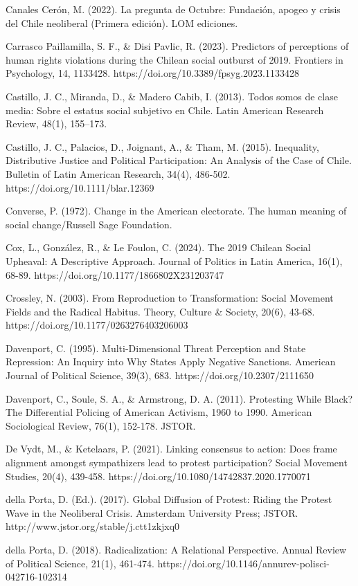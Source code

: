 \documentclass[
  13pt,
]{article}
\begin{document}
Canales Cerón, M. (2022). La pregunta de Octubre: Fundación, apogeo y
crisis del Chile neoliberal (Primera edición). LOM ediciones.

Carrasco Paillamilla, S. F., \& Disi Pavlic, R. (2023). Predictors of
perceptions of human rights violations during the Chilean social
outburst of 2019. Frontiers in Psychology, 14, 1133428.
https://doi.org/10.3389/fpsyg.2023.1133428

Castillo, J. C., Miranda, D., \& Madero Cabib, I. (2013). Todos somos de
clase media: Sobre el estatus social subjetivo en Chile. Latin American
Research Review, 48(1), 155--173.

Castillo, J. C., Palacios, D., Joignant, A., \& Tham, M. (2015).
Inequality, Distributive Justice and Political Participation: An
Analysis of the Case of Chile. Bulletin of Latin American Research,
34(4), 486-502. https://doi.org/10.1111/blar.12369

Converse, P. (1972). Change in the American electorate. The human
meaning of social change/Russell Sage Foundation.

Cox, L., González, R., \& Le Foulon, C. (2024). The 2019 Chilean Social
Upheaval: A Descriptive Approach. Journal of Politics in Latin America,
16(1), 68-89. https://doi.org/10.1177/1866802X231203747

Crossley, N. (2003). From Reproduction to Transformation: Social
Movement Fields and the Radical Habitus. Theory, Culture \& Society,
20(6), 43-68. https://doi.org/10.1177/0263276403206003

Davenport, C. (1995). Multi-Dimensional Threat Perception and State
Repression: An Inquiry into Why States Apply Negative Sanctions.
American Journal of Political Science, 39(3), 683.
https://doi.org/10.2307/2111650

Davenport, C., Soule, S. A., \& Armstrong, D. A. (2011). Protesting
While Black? The Differential Policing of American Activism, 1960 to
1990. American Sociological Review, 76(1), 152-178. JSTOR.

De Vydt, M., \& Ketelaars, P. (2021). Linking consensus to action: Does
frame alignment amongst sympathizers lead to protest participation?
Social Movement Studies, 20(4), 439-458.
https://doi.org/10.1080/14742837.2020.1770071

della Porta, D. (Ed.). (2017). Global Diffusion of Protest: Riding the
Protest Wave in the Neoliberal Crisis. Amsterdam University Press;
JSTOR. http://www.jstor.org/stable/j.ctt1zkjxq0

della Porta, D. (2018). Radicalization: A Relational Perspective. Annual
Review of Political Science, 21(1), 461-474.
https://doi.org/10.1146/annurev-polisci-042716-102314
\end{document}
